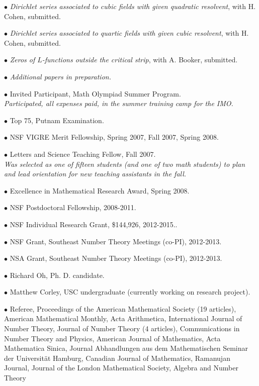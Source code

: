 \documentclass{article}
\newcommand{\categorywidth}{1in}        %
\newcommand{\categorysep}{5pt}
\newcommand{\catlistlabel}[1]%
{\raisebox{0pt}[1ex][0pt]{\makebox[\labelwidth][l]%
    {\parbox[t]{\labelwidth}{\hspace{0pt}\textbf{#1}}}}}
\newenvironment{categories}{\begin{list}{}{
      \setlength{\labelwidth}{\categorywidth}
      \setlength{\leftmargin}{\labelwidth}
      \addtolength{\leftmargin}{\labelsep}
      \setlength{\topsep}{20pt}
      \setlength{\itemsep}{\categorysep}
      \renewcommand{\makelabel}{\catlistlabel}
      }}{\end{list}}
\newcommand{\category}[1]{\item[#1]}
\begin{document}
\begin{flushleft}
\begin{categories}
{  $\bullet$ {\itshape Dirichlet series associated to cubic fields with given quadratic resolvent}, with H. Cohen,
submitted.


  $\bullet$ {\itshape Dirichlet series associated to quartic fields with given cubic resolvent}, with H. Cohen, submitted.

  $\bullet$ {\itshape Zeros of $L$-functions outside the critical strip}, with A. Booker, submitted.

  $\bullet$ {\itshape Additional papers in preparation.}

  \category{Awards and \\ Prizes}

  $\bullet$ {Invited Participant, Math Olympiad Summer Program. \\
  \itshape Participated, all expenses paid, in the summer training camp for the IMO. \upshape }

  $\bullet$ {Top 75, Putnam Examination.}

  $\bullet$ {NSF VIGRE Merit Fellowship, Spring 2007, Fall 2007, Spring 2008.}

  $\bullet$ {Letters and Science Teaching Fellow, Fall 2007. \\
\itshape Was selected as one of fifteen students (and one of two math students)
to plan and lead orientation for new teaching assistants in the fall.
\upshape }

  $\bullet$ {Excellence in Mathematical Research Award, Spring 2008.}

  $\bullet$ {NSF Postdoctoral Fellowship, 2008-2011.}

  $\bullet$ {NSF Individual Research Grant, \$144,926, 2012-2015..}

  $\bullet$ {NSF Grant, Southeast Number Theory Meetings (co-PI), 2012-2013.}

  $\bullet$ {NSA Grant, Southeast Number Theory Meetings (co-PI), 2012-2013.}

\category{Students \\ Supervised}
$\bullet$ Richard Oh, Ph. D. candidate.

$\bullet$ Matthew Corley, USC undergraduate (currently working on research project).

\category{Professional Service} 
$\bullet$ {Referee, Proceedings of the American Mathematical Society (19 articles),
American Mathematical Monthly,
Acta Arithmetica,
International Journal of Number Theory, Journal of Number Theory (4 articles), Communications in Number Theory and Physics,
American Journal of Mathematics, Acta Mathematica Sinica,
Journal Abhandlungen aus dem Mathematischen Seminar der Universit\"at Hamburg,
Canadian Journal of Mathematics,
Ramanujan Journal,
Journal of the London Mathematical Society,
Algebra and Number Theory}

}
\end{categories}
\end{flushleft}
\end{document}
